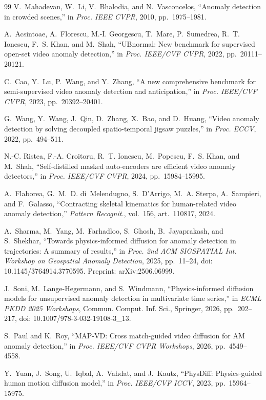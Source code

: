\documentclass[11pt,a4paper]{article}
\begin{document}
\begin{thebibliography}{99}
V.~Mahadevan, W.~Li, V.~Bhalodia, and N.~Vasconcelos, ``Anomaly detection in crowded scenes,'' in \emph{Proc. IEEE CVPR}, 2010, pp.~1975--1981.

A.~Acsintoae, A.~Florescu, M.-I. Georgescu, T.~Mare, P.~Sumedrea, R.~T. Ionescu, F.~S. Khan, and M.~Shah, ``UBnormal: New benchmark for supervised open-set video anomaly detection,'' in \emph{Proc. IEEE/CVF CVPR}, 2022, pp.~20111--20121.

C.~Cao, Y.~Lu, P.~Wang, and Y.~Zhang, ``A new comprehensive benchmark for semi-supervised video anomaly detection and anticipation,'' in \emph{Proc. IEEE/CVF CVPR}, 2023, pp.~20392--20401.

G.~Wang, Y.~Wang, J.~Qin, D.~Zhang, X.~Bao, and D.~Huang, ``Video anomaly detection by solving decoupled spatio-temporal jigsaw puzzles,'' in \emph{Proc. ECCV}, 2022, pp.~494--511.

N.-C. Ristea, F.-A. Croitoru, R.~T. Ionescu, M.~Popescu, F.~S. Khan, and M.~Shah, ``Self-distilled masked auto-encoders are efficient video anomaly detectors,'' in \emph{Proc. IEEE/CVF CVPR}, 2024, pp.~15984--15995.

A.~Flaborea, G.~M.~D. di~Melendugno, S.~D'Arrigo, M.~A. Sterpa, A.~Sampieri, and F.~Galasso, ``Contracting skeletal kinematics for human-related video anomaly detection,'' \emph{Pattern Recognit.}, vol.~156, art.~110817, 2024.

A.~Sharma, M.~Yang, M.~Farhadloo, S.~Ghosh, B.~Jayaprakash, and S.~Shekhar, ``Towards physics-informed diffusion for anomaly detection in trajectories: A summary of results,'' in \emph{Proc. 2nd ACM SIGSPATIAL Int. Workshop on Geospatial Anomaly Detection}, 2025, pp.~11--24, doi: 10.1145/3764914.3770595. Preprint: arXiv:2506.06999.

J.~Soni, M.~Lange-Hegermann, and S.~Windmann, ``Physics-informed diffusion models for unsupervised anomaly detection in multivariate time series,'' in \emph{ECML PKDD 2025 Workshops}, Commun. Comput. Inf. Sci., Springer, 2026, pp.~202--217, doi: 10.1007/978-3-032-19108-3\_13.

S.~Paul and K.~Roy, ``MAP-VD: Cross match-guided video diffusion for AM anomaly detection,'' in \emph{Proc. IEEE/CVF CVPR Workshops}, 2026, pp.~4549--4558.

Y.~Yuan, J.~Song, U.~Iqbal, A.~Vahdat, and J.~Kautz, ``PhysDiff: Physics-guided human motion diffusion model,'' in \emph{Proc. IEEE/CVF ICCV}, 2023, pp.~15964--15975.

\end{thebibliography}
\end{document}
